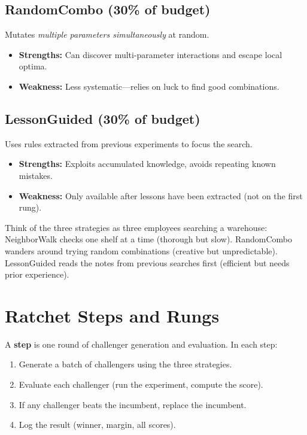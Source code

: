 \documentclass[11pt,a4paper,twoside]{report}
\theoremstyle{definition}
\begin{document}
\subsection{RandomCombo (30\% of budget)}

Mutates \emph{multiple parameters simultaneously} at random.

\begin{itemize}
  \item \textbf{Strengths:} Can discover multi-parameter interactions
        and escape local optima.
  \item \textbf{Weakness:} Less systematic---relies on luck to find
        good combinations.
\end{itemize}

\subsection{LessonGuided (30\% of budget)}

Uses rules extracted from previous experiments to focus the search.

\begin{itemize}
  \item \textbf{Strengths:} Exploits accumulated knowledge, avoids
        repeating known mistakes.
  \item \textbf{Weakness:} Only available after lessons have been
        extracted (not on the first rung).
\end{itemize}

\begin{intuition}
Think of the three strategies as three employees searching a warehouse:
NeighborWalk checks one shelf at a time (thorough but slow).
RandomCombo wanders around trying random combinations (creative but
unpredictable). LessonGuided reads the notes from previous searches
first (efficient but needs prior experience).
\end{intuition}

\section{Ratchet Steps and Rungs}

A \textbf{step} is one round of challenger generation and evaluation.
In each step:
\begin{enumerate}
  \item Generate a batch of challengers using the three strategies.
  \item Evaluate each challenger (run the experiment, compute the score).
  \item If any challenger beats the incumbent, replace the incumbent.
  \item Log the result (winner, margin, all scores).
\end{enumerate}
\end{document}
